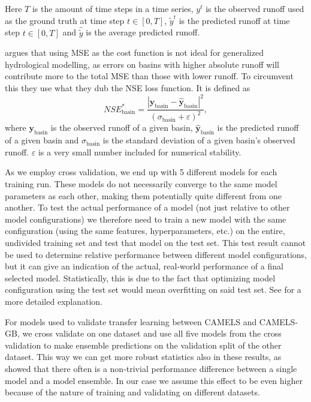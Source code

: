 Here $T$ is the amount of time steps in a time series, $y^t$ is the observed runoff 
used as the ground truth at time step $t\in[0,T]$, $\tilde{y}^t$ is the predicted runoff at time step $t\in[0,T]$ and $\hat{\tilde{y}}$ is the average predicted runoff.

\citet{lstm_second_paper} argues that using MSE as the cost function is not ideal
for generalized hydrological modelling, as errors on basins with higher absolute 
runoff will contribute more to the total MSE than those with lower runoff. To circumvent 
this they use what they dub the NSE loss function. It is defined as 
\begin{equation}
NSE^*_\text{basin} = \frac{\left| \bm{y}_\text{basin} - \bm{\hat{y}}_\text{basin} 
\right|^2}{\left( \sigma_\text{basin} + \varepsilon \right)^2} \label{NSE loss},
\end{equation}
where $\bm{y}_\text{basin}$ is the observed runoff of a given basin, 
$\bm{\hat{y}}_\text{basin}$ is the predicted runoff of a given basin 
and $\sigma_\text{basin}$ is the standard deviation of a given basin's observed 
runoff. $\varepsilon$ is a very small number included for numerical stability.

As we employ cross validation, we  end up with 5 different models 
for each training run. These models do not necessarily converge to the same model parameters 
as each other, making them potentially quite different from one another. To test the 
actual performance of a model (not just relative to other model configurations) we 
therefore need to train a new model with the same configuration (using the same features, 
hyperparameters, etc.) on the entire, undivided training set and test that model 
on the test set. This test result cannot be used to determine relative performance 
between different model configurations, but it can give an indication of the actual, 
real-world performance of a final selected model. Statistically, this is due to the 
fact that optimizing model configuration using the test set would mean overfitting 
on said test set. See \citet{elemstatlearn} for a more detailed explanation.

For models used to validate transfer learning between CAMELS and CAMELS-GB, we 
cross validate on one dataset and use all five models from the cross validation 
to make ensemble predictions on the validation split of the other dataset. This 
way we can get more robust statistics also in these results, as \citet{lstm_second_paper} 
showed that there often is a non-trivial performance difference between a single
model and a model ensemble. In our case we assume this effect to be even higher 
because of the nature of training and validating on different datasets.

